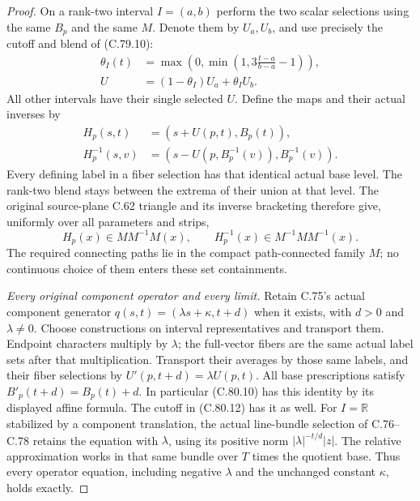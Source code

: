 \begin{proof}
On a rank-two interval $I=(a,b)$ perform the
two scalar selections using the same $B_p$
and the same $M$. Denote them by $U_a,U_b$,
and use precisely the cutoff and blend of
(C.79.10):
\[
 \begin{split}
 \theta_I(t)&=\max\left(0,\min\left(1,
                     3\frac{t-a}{b-a}-1\right)\right),\\
 U&=(1-\theta_I)U_a+\theta_I U_b.
 \end{split}
                                                               \tag{C.80.12}
\]
All other intervals have their single selected
$U$. Define the maps and their actual inverses by
\[
 \begin{split}
 H_p(s,t)&=(s+U(p,t),B_p(t)),\\
 H_p^{-1}(s,v)&=
    (s-U(p,B_p^{-1}(v)),B_p^{-1}(v)).
 \end{split}
                                                               \tag{C.80.13}
\]
Every defining label in a fiber selection has
that identical actual base level. The rank-two
blend stays between the extrema of their union
at that level. The original source-plane C.62
triangle and its inverse bracketing therefore
give, uniformly over all parameters and strips,
\[
 H_p(x)\in M M^{-1}M(x),\qquad
 H_p^{-1}(x)\in M^{-1}M M^{-1}(x).
                                                               \tag{C.80.14}
\]
The required connecting paths lie in the
compact path-connected family $M$; no continuous
choice of them enters these set containments.

\emph{Every original component operator and every limit.}
Retain C.75's actual component generator
$q(s,t)=(\lambda s+\kappa,t+d)$ when it exists,
with $d>0$ and $\lambda\ne0$. Choose constructions
on interval representatives and transport them.
Endpoint characters multiply by $\lambda$;
the full-vector fibers are the same actual
label sets after that multiplication. Transport
their averages by those same labels, and their
fiber selections by $U'(p,t+d)=\lambda U(p,t)$.
All base prescriptions satisfy
$B'_p(t+d)=B_p(t)+d$. In particular (C.80.10)
has this identity by its displayed affine formula.
The cutoff in (C.80.12) has it as well.
For $I=\mathbb R$ stabilized by a component
translation, the actual line-bundle selection
of C.76--C.78 retains the equation with
$\lambda$, using its positive norm
$|\lambda|^{-t/d}|z|$. The relative approximation
works in that same bundle over $T$ times the
quotient base. Thus every operator equation,
including negative $\lambda$ and the unchanged
constant $\kappa$, holds exactly.


\end{proof}
